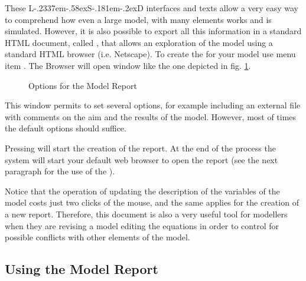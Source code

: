 \documentclass [11pt,a4paper] {book}
\def\LsD{{L\kern-.2337em\lower-.58ex\hbox{S}\kern-.181em\lower-.2ex\hbox{D}}\xspace}
\begin{document}
These \LsD interfaces and texts allow a very easy way to comprehend how even a large
model, with many elements works and is simulated. However, it is also possible to export
all this information in a standard HTML document, called , that allows
an exploration of the model using a standard HTML browser (i.e. Netscape). To create the
 for your model use menu item . The Browser
will open window like the one depicted in fig. \ref{fig:createreport}.

\begin{figure}[ht]
  \centering
  \caption{Options for the Model Report}
  \label{fig:createreport}
\end{figure}

This window permits to set several options, for example including an external file with
comments on the aim and the results of the model. However, most of times the default
options should suffice.

Pressing  will start the creation of the report. At the end of the process the
system will start your default web browser to open the report (see the next paragraph for
the use of the ).

Notice that the operation of updating the description of the variables of the model costs
just two clicks of the mouse, and the same applies for the creation of a new report.
Therefore, this document is also a very useful tool for modellers when they are revising
a model editing the equations in order to control for possible conflicts with other
elements of the model.

\subsection{Using the Model Report}
\end{document}
